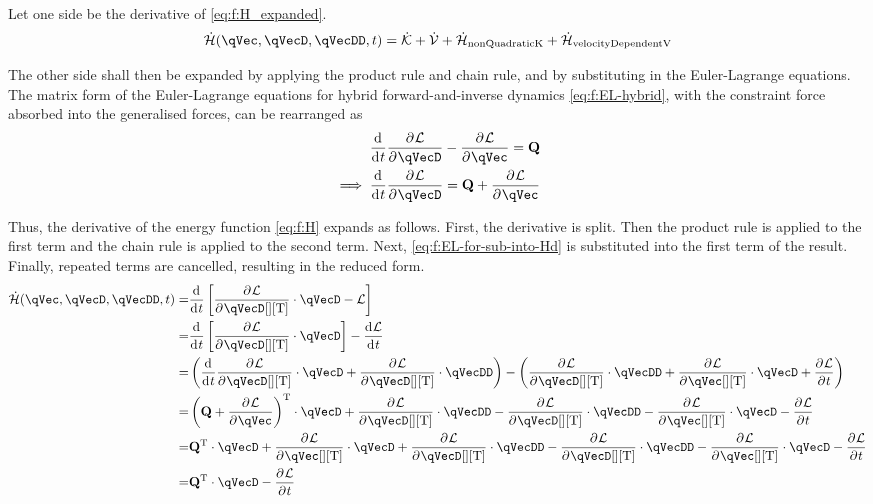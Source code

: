 \documentclass[11pt]{article}
\newcommand{\oD}[2]{
    \frac{\mathrm{d}\mspace{1mu}#1}{\mathrm{d}\mspace{1mu}#2}
}
\newcommand{\pD}[2]{
    \frac{\partial\mspace{1mu}#1}{\partial\mspace{1mu}#2}
}
\begin{document}
Let one side be the derivative of \eqref{eq:f:H_expanded}.
\begin{equation} \label{eq:f:Hd}
    \dot{\mathcal{H}}(\qVec, \qVecD, \qVecDD, t)
    = \dot{\mathcal{K}} + \dot{\mathcal{V}} + \dot{\mathcal{H}}_{\mathrm{nonQuadraticK}} + \dot{\mathcal{H}}_{\mathrm{velocityDependentV}}
\end{equation}

The other side shall then be expanded by applying the product rule and chain rule, and by substituting in the Euler-Lagrange equations. The matrix form of the Euler-Lagrange equations for hybrid forward-and-inverse dynamics \eqref{eq:f:EL-hybrid}, with the constraint force absorbed into the generalised forces, can be rearranged as
\begin{align} \label{eq:f:EL-for-sub-into-Hd}
    \oD{}{t}\pD{\mathcal{L}}{\qVecD} - \pD{\mathcal{L}}{\qVec} = \mathbf{Q} \nonumber\\
    \implies \oD{}{t}\pD{\mathcal{L}}{\qVecD} = \mathbf{Q} + \pD{\mathcal{L}}{\qVec}
\end{align}

Thus, the derivative of the energy function \eqref{eq:f:H} expands as follows. First, the derivative is split. Then the product rule is applied to the first term and the chain rule is applied to the second term. Next, \eqref{eq:f:EL-for-sub-into-Hd} is substituted into the first term of the result. Finally, repeated terms are cancelled, resulting in the reduced form.
\begin{align} \label{eq:f:Hd_work}
    \dot{\mathcal{H}}(\qVec, \qVecD, \qVecDD, t)
    =& \oD{}{t}\sbr{\pD{\mathcal{L}}{\qVecD[][\mathrm{T}]} \cdot \qVecD - \mathcal{L}} \nonumber\\
    =& \oD{}{t}\sbr{\pD{\mathcal{L}}{\qVecD[][\mathrm{T}]} \cdot \qVecD}
        - \oD{\mathcal{L}}{t} \nonumber\\
    =& \del{
            \oD{}{t}\pD{\mathcal{L}}{\qVecD[][\mathrm{T}]} \cdot \qVecD
            + \pD{\mathcal{L}}{\qVecD[][\mathrm{T}]} \cdot \qVecDD
        }
        - \del{
            \pD{\mathcal{L}}{\qVecD[][\mathrm{T}]} \cdot \qVecDD
            + \pD{\mathcal{L}}{\qVec[][\mathrm{T}]} \cdot \qVecD
            + \pD{\mathcal{L}}{t}
        } \nonumber\\
    =& \del{\mathbf{Q} + \pD{\mathcal{L}}{\qVec}}^{\mathrm{T}} \cdot \qVecD
        + \pD{\mathcal{L}}{\qVecD[][\mathrm{T}]} \cdot \qVecDD
        - \pD{\mathcal{L}}{\qVecD[][\mathrm{T}]} \cdot \qVecDD
        - \pD{\mathcal{L}}{\qVec[][\mathrm{T}]} \cdot \qVecD
        - \pD{\mathcal{L}}{t} \nonumber\\
    =& \mathbf{Q}^{\mathrm{T}} \cdot \qVecD
        + \pD{\mathcal{L}}{\qVec[][\mathrm{T}]} \cdot \qVecD
        + \pD{\mathcal{L}}{\qVecD[][\mathrm{T}]} \cdot \qVecDD
        - \pD{\mathcal{L}}{\qVecD[][\mathrm{T}]} \cdot \qVecDD
        - \pD{\mathcal{L}}{\qVec[][\mathrm{T}]} \cdot \qVecD
        - \pD{\mathcal{L}}{t} \nonumber\\
    =& \mathbf{Q}^{\mathrm{T}} \cdot \qVecD
        - \pD{\mathcal{L}}{t}
\end{align}
\end{document}
